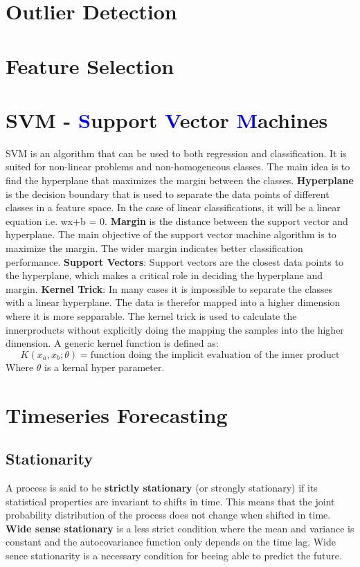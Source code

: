 \section{Outlier Detection}

\section{Feature Selection}

\section{SVM - \textcolor{blue}{S}upport \textcolor{blue}{V}ector \textcolor{blue}{M}achines}
SVM is an algorithm that can be used to both regression and classification. It is suited for non-linear problems and non-homogeneous classes. The main idea is to find the hyperplane that maximizes the margin between the classes. 
\indent \textbf{Hyperplane} is the decision boundary that is used to separate the data points of different classes in a feature space. In the case of linear classifications, it will be a linear equation i.e. wx+b = 0.
\newline \indent \textbf{Margin} is the distance between the support vector and hyperplane. The main objective of the support vector machine algorithm is to maximize the margin.  The wider margin indicates better classification performance.
\newline \indent \textbf{Support Vectors}: Support vectors are the closest data points to the hyperplane, which makes a critical role in deciding the hyperplane and margin.
\newline \indent \textbf{Kernel Trick}: In many cases it is impossible to separate the classes with a linear hyperplane. The data is therefor mapped into a higher dimension where it is more sepparable. The kernel trick is used to calculate the innerproducts without explicitly doing the mapping the samples into the higher dimension. A generic kernel function is defined as:
\begin{equation}
    K(x_a, x_b; \theta) = \text{function doing the implicit evaluation of the inner product}
\end{equation}
Where $\theta$ is a kernal hyper parameter.


\section{Timeseries Forecasting}

\subsection{Stationarity}
A process is said to be \textbf{strictly stationary} (or strongly stationary) if its statistical properties are invariant to shifts in time. This means that the joint probability distribution of the process does not change when shifted in time. \textbf{Wide sense stationary} is a less strict condition where the mean and variance is constant and the autocovariance function only depends on the time lag. Wide sence stationarity is a necessary condition for beeing able to predict the future.


